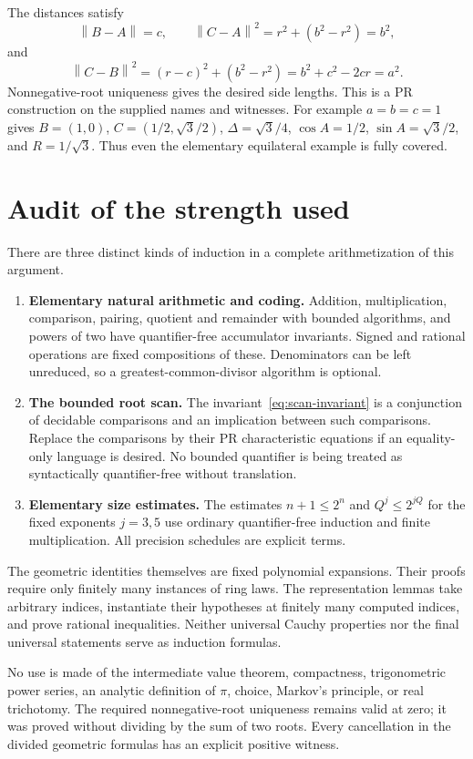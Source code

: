 \documentclass[11pt,a4paper]{article}
\theoremstyle{definition}
\newcommand{\norm}[1]{\left\lVert#1\right\rVert}
\numberwithin{equation}{section}
\begin{document}
The distances satisfy
\[
 \norm{B-A}=c,\qquad
 \norm{C-A}^2=r^2+(b^2-r^2)=b^2,
\]
and
\[
 \norm{C-B}^2=(r-c)^2+(b^2-r^2)
 =b^2+c^2-2cr=a^2.
\]
Nonnegative-root uniqueness gives the desired side lengths.
This is a PR construction on the supplied names and witnesses.
For example \(a=b=c=1\) gives
\(B=(1,0)\), \(C=(1/2,\sqrt3/2)\),
\(\Delta=\sqrt3/4\), \(\cos A=1/2\),
\(\sin A=\sqrt3/2\), and \(R=1/\sqrt3\).
Thus even the elementary equilateral example is fully covered.

\section{Audit of the strength used}\label{sec:audit}

There are three distinct kinds of induction in a complete
arithmetization of this argument.

\begin{enumerate}
\item \textbf{Elementary natural arithmetic and coding.}
Addition, multiplication, comparison, pairing, quotient and
remainder with bounded algorithms, and powers of two have
quantifier-free accumulator invariants. Signed and rational
operations are fixed compositions of these. Denominators can be
left unreduced, so a greatest-common-divisor algorithm is optional.
\item \textbf{The bounded root scan.}
The invariant~\eqref{eq:scan-invariant} is a conjunction of
decidable comparisons and an implication between such comparisons.
Replace the comparisons by their PR characteristic equations if
an equality-only language is desired. No bounded quantifier is
being treated as syntactically quantifier-free without translation.
\item \textbf{Elementary size estimates.}
The estimates \(n+1\le2^n\) and \(Q^j\le2^{jQ}\) for the fixed
exponents \(j=3,5\) use ordinary quantifier-free induction and
finite multiplication. All precision schedules are explicit terms.
\end{enumerate}

The geometric identities themselves are fixed polynomial expansions.
Their proofs require only finitely many instances of ring laws.
The representation lemmas take arbitrary indices, instantiate
their hypotheses at finitely many computed indices, and prove
rational inequalities. Neither universal Cauchy properties nor
the final universal statements serve as induction formulas.

No use is made of the intermediate value theorem, compactness,
trigonometric power series, an analytic definition of \(\pi\),
choice, Markov's principle, or real trichotomy. The required
nonnegative-root uniqueness remains valid at zero; it was proved
without dividing by the sum of two roots. Every cancellation in
the divided geometric formulas has an explicit positive witness.
\end{document}
